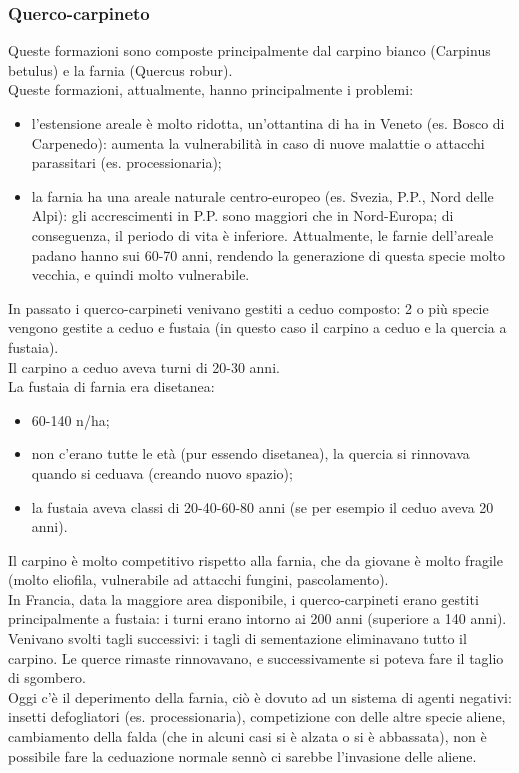 \subsubsection{Querco-carpineto} 
Queste formazioni sono composte principalmente dal carpino bianco (Carpinus betulus) e la farnia (Quercus robur).\\
Queste formazioni, attualmente, hanno principalmente i problemi: 
\begin{itemize}[nosep]
    \item l'estensione areale è molto ridotta, un'ottantina di ha in Veneto (es. Bosco di Carpenedo): aumenta la vulnerabilità in caso di nuove malattie o attacchi parassitari (es. processionaria); 
    \item la farnia ha una areale naturale centro-europeo (es. Svezia, P.P., Nord delle Alpi): gli accrescimenti in P.P. sono maggiori che in Nord-Europa; di conseguenza, il periodo di vita è inferiore. Attualmente, le farnie dell'areale padano hanno sui 60-70 anni, rendendo la generazione di questa specie molto vecchia, e quindi molto vulnerabile.  
\end{itemize}
In passato i querco-carpineti venivano gestiti a ceduo composto: 2 o più specie vengono gestite a ceduo e fustaia (in questo caso il carpino a ceduo e la quercia a fustaia).\\
Il carpino a ceduo aveva turni di 20-30 anni.\\
La fustaia di farnia era disetanea:
\begin{itemize}[nosep]
    \item 60-140 \unit{n/ha};
    \item non c'erano tutte le età (pur essendo disetanea), la quercia si rinnovava quando si ceduava (creando nuovo spazio);
    \item la fustaia aveva classi di 20-40-60-80 anni (se per esempio il ceduo aveva 20 anni).
\end{itemize}
Il carpino è molto competitivo rispetto alla farnia, che da giovane è molto fragile (molto eliofila, vulnerabile ad attacchi fungini, pascolamento).\\
In Francia, data la maggiore area disponibile, i querco-carpineti erano gestiti principalmente a fustaia: i turni erano intorno ai 200 anni (superiore a 140 anni). Venivano svolti tagli successivi: i tagli di sementazione eliminavano tutto il carpino. Le querce rimaste rinnovavano, e successivamente si poteva fare il taglio di sgombero.\\
Oggi c'è il deperimento della farnia, ciò è dovuto ad un sistema di agenti negativi: insetti defogliatori (es. processionaria), competizione con delle altre specie aliene, cambiamento della falda (che in alcuni casi si è alzata o si è abbassata), non è possibile fare la ceduazione normale sennò ci sarebbe l'invasione delle aliene.\\
